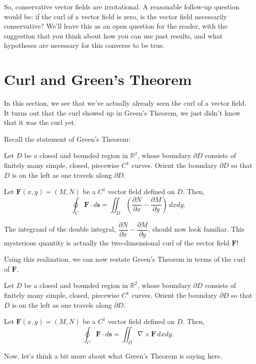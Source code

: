 \documentclass{ximera}
\begin{document}
So, conservative vector fields are irrotational. A reasonable follow-up question would be: if the curl of a vector field is zero, is the vector field necessarily conservative? We'll leave this as an open question for the reader, with the suggestion that you think about how you can use past results, and what hypotheses are necessary for this converse to be true.


\section*{Curl and Green's Theorem}

In this section, we see that we've actually already seen the curl of a vector field. It turns out that the curl showed up in Green's Theorem, we just didn't know that it was the curl yet.

Recall the statement of Green's Theorem:

\begin{theorem}
Let $D$ be a closed and bounded region in $\mathbb{R}^2$, whose boundary $\partial D$ consists of finitely many simple, closed, piecewise $C^1$ curves. Orient the boundary $\partial D$ so that $D$ is on the left as one travels along $\partial D$.

Let $\mathbf{F}(x,y)=(M,N)$ be a $C^1$ vector field defined on $D$. Then,
\[
\oint_C\mathbf{F}\cdot d\mathbf{s} = \iint_D\left(\dfrac{\partial N}{\partial x}-\dfrac{\partial M}{\partial y}\right)\,dxdy.
\]
\end{theorem}

The integrand of the double integral, $\dfrac{\partial N}{\partial x}-\dfrac{\partial M}{\partial y}$, should now look familiar. This mysterious quantity is actually the two-dimensional curl of the vector field $\mathbf{F}$!

Using this realization, we can now restate Green's Theorem in terms of the curl of $\mathbf{F}$.

\begin{theorem}
Let $D$ be a closed and bounded region in $\mathbb{R}^2$, whose boundary $\partial D$ consists of finitely many simple, closed, piecewise $C^1$ curves. Orient the boundary $\partial D$ so that $D$ is on the left as one travels along $\partial D$.

Let $\mathbf{F}(x,y)=(M,N)$ be a $C^1$ vector field defined on $D$. Then,
\[
\oint_C\mathbf{F}\cdot d\mathbf{s} = \iint_D\nabla\times\mathbf{F}\,dxdy.
\]
\end{theorem}

Now, let's think a bit more about what Green's Theorem is saying here.
\end{document}
